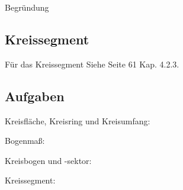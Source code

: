 Begründung

\subsection{Kreissegment}

Für das Kreissegment Siehe \cite{marthaler20geom} Seite 61 Kap. 4.2.3.



\newpage
\subsection*{Aufgaben}

Kreisfläche, Kreisring und Kreisumfang:


Bogenmaß:


Kreisbogen und -sektor:



Kreissegment:




\newpage
